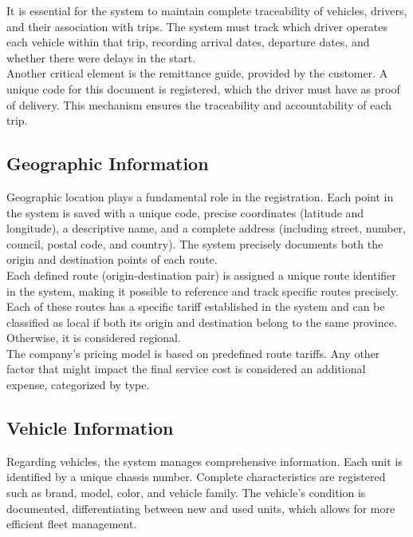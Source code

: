 \documentclass[11pt, a4paper]{article}
\begin{document}
It is essential for the system to maintain complete traceability of vehicles, drivers, and their association with trips. The system must track which driver operates each vehicle within that trip, recording arrival dates, departure dates, and whether there were delays in the start.\\

Another critical element is the remittance guide, provided by the customer. A unique code for this document is registered, which the driver must have as proof of delivery. This mechanism ensures the traceability and accountability of each trip.\\

\subsection*{Geographic Information}
Geographic location plays a fundamental role in the registration. Each point in the system is saved with a unique code, precise coordinates (latitude and longitude), a descriptive name, and a complete address (including street, number, council, postal code, and country). The system precisely documents both the origin and destination points of each route.\\

Each defined route (origin-destination pair) is assigned a unique route identifier in the system, making it possible to reference and track specific routes precisely. Each of these routes has a specific tariff established in the system and can be classified as local if both its origin and destination belong to the same province. Otherwise, it is considered regional.\\

The company's pricing model is based on predefined route tariffs. Any other factor that might impact the final service cost is considered an additional expense, categorized by type.\\

\subsection*{Vehicle Information}
Regarding vehicles, the system manages comprehensive information. Each unit is identified by a unique chassis number. Complete characteristics are registered such as brand, model, color, and vehicle family. The vehicle's condition is documented, differentiating between new and used units, which allows for more efficient fleet management.\\
\end{document}
